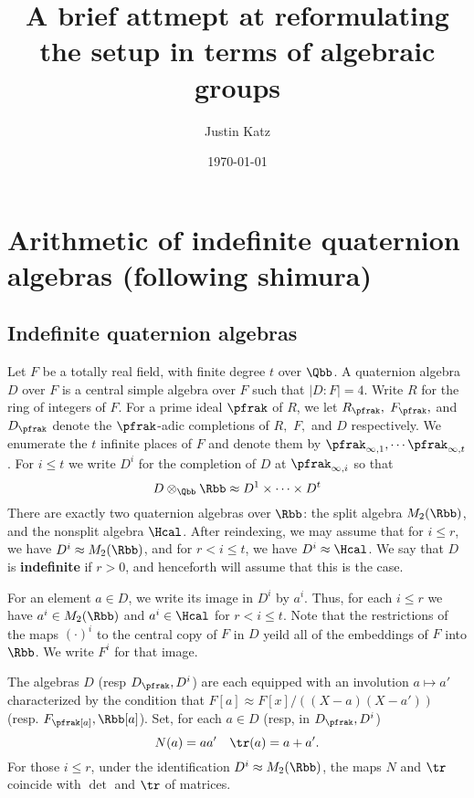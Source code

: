 \documentclass[11pt]{amsart}
\author{Justin Katz}
\date{\today}
\title{A brief attmept at reformulating the setup in terms of algebraic groups}
\begin{document}
\maketitle


\section{Arithmetic of indefinite quaternion algebras (following shimura)}
\label{sec:org8b2862a}
\subsection{Indefinite quaternion algebras}
\label{sec:orgef86b72}
Let \(F\) be a totally real field, with finite degree \(t\) over \(\Qbb\).
A quaternion algebra \(D\) over \(F\) is a central simple algebra over \(F\) such that \(|D:F|=4\).
Write \(R\) for the ring of integers of \(F\).
For a
prime ideal $\pfrak$ of \(R\), we let $R_\pfrak,$ $F_\pfrak,$ and \(D_\pfrak\) denote the $\pfrak$-adic completions of $R,$ $F,$ and \(D\) respectively.
We enumerate the \(t\) infinite places of \(F\) and denote them by \(\pfrak_{\infty,1},\cdots \pfrak_{\infty,t}\).
For \(i \leq t\) we write \(D^i\) for the completion of \(D\) at \(\pfrak_{\infty,i}\) so that
\[ D \otimes_\Qbb \Rbb \approx D^1 \times \cdots \times D^t \]
There are exactly two quaternion algebras over \(\Rbb\): the split algebra \(M_2(\Rbb)\), and the nonsplit algebra \(\Hcal\).
After reindexing, we may assume that for \(i \leq r\), we have \(D^i \approx M_2(\Rbb)\), and for \(r < i \leq t\), we have \(D^i \approx \Hcal\).
We say that \(D\) is \textbf{indefinite} if \(r>0\), and henceforth will assume that this is the case.

For an element \(a \in D\), we write its image in \(D^i\) by \(a^i\).
Thus, for each \(i \leq r\) we have \(a^i \in M_2(\Rbb)\) and \(a^i \in \Hcal\) for \(r < i \leq t\).
Note that the restrictions of the maps \((\cdot)^i\) to the central copy of \(F\) in  \(D\) yeild all of the embeddings of \(F\) into \(\Rbb\).
We write \(F^i\) for that image.

The algebras \(D\) (resp \(D_\pfrak,D^i\))  are each equipped with an involution \(a \mapsto a'\) characterized by the condition that \(F[a] \approx F[x]/ ((X-a)(X-a'))\) (resp.
\(F_\pfrak[a], \Rbb[a]\)).
Set, for each \(a \in D\) (resp, in \(D_\pfrak, D^i\))
\[ N(a) = aa' \quad \tr(a) = a + a'.
\]
For those \(i\leq r\), under the identification \(D^i \approx M_2(\Rbb)\), the maps \(N\) and \(\tr\) coincide with \(\det\) and \(\tr\) of matrices.
\end{document}
